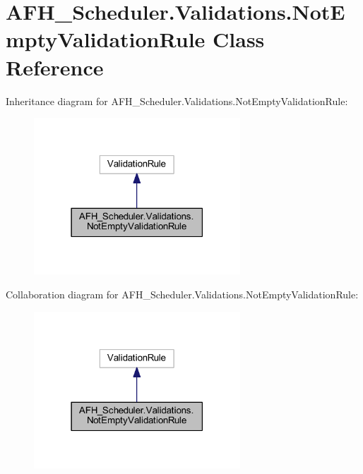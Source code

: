 \section{A\+F\+H\+\_\+\+Scheduler.\+Validations.\+Not\+Empty\+Validation\+Rule Class Reference}
\label{class_a_f_h___scheduler_1_1_validations_1_1_not_empty_validation_rule}


Inheritance diagram for A\+F\+H\+\_\+\+Scheduler.\+Validations.\+Not\+Empty\+Validation\+Rule\+:
\nopagebreak
\begin{figure}[H]
\begin{center}
\leavevmode
\includegraphics[width=219pt]{class_a_f_h___scheduler_1_1_validations_1_1_not_empty_validation_rule__inherit__graph}
\end{center}
\end{figure}


Collaboration diagram for A\+F\+H\+\_\+\+Scheduler.\+Validations.\+Not\+Empty\+Validation\+Rule\+:
\nopagebreak
\begin{figure}[H]
\begin{center}
\leavevmode
\includegraphics[width=219pt]{class_a_f_h___scheduler_1_1_validations_1_1_not_empty_validation_rule__coll__graph}
\end{center}
\end{figure}
